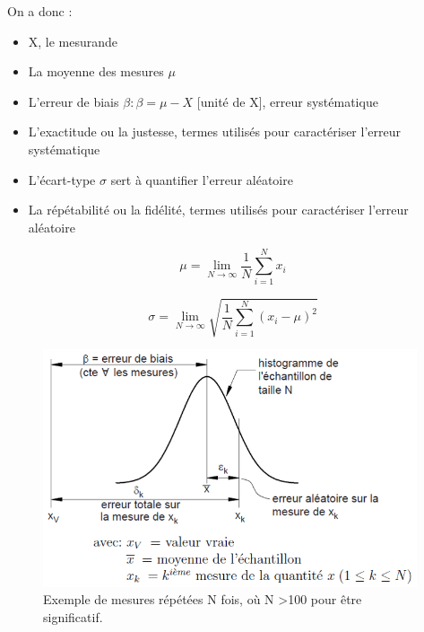 \documentclass[main.tex]{subfiles}
\begin{document}
\newpage
On a donc :
\begin{itemize}
    \item X, le mesurande
    \item La moyenne des mesures $\mu$
    \item L'erreur de biais $\beta :  \beta = \mu - X$  [unité de X], erreur systématique
    \item L'exactitude ou la justesse, termes utilisés pour caractériser l'erreur systématique
    \item L'écart-type $\sigma$ sert à quantifier l'erreur aléatoire
    \item La répétabilité ou la fidélité, termes utilisés pour caractériser l'erreur aléatoire
\end{itemize}

\begin{equation}
    \mu = \lim\limits_{N \to \infty} \frac{1}{N} \sum_{i=1}^N x_i
\end{equation}

\begin{equation}
    \sigma = \lim\limits_{N \to \infty} \sqrt{\frac{1}{N}\sum_{i=1}^N (x_i-\mu)^2}
\end{equation}

\begin{figure}
    \centering
    \includegraphics[height=7cm]{assets/figures/3_7_Exemple_de_mesures_repetees_N_fois.PNG}
    \caption{Exemple de mesures répétées N fois, où N >100 pour être significatif.}
    \label{fig:Exemple_de_mesures_repetees_N_fois}
\end{figure}
\end{document}
